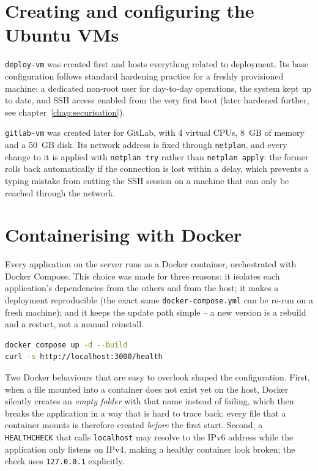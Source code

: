 \section{Creating and configuring the Ubuntu VMs}
\texttt{deploy-vm} was created first and hosts everything related to deployment. Its base configuration follows standard hardening practice for a freshly provisioned machine: a dedicated non-root user for day-to-day operations, the system kept up to date, and SSH access enabled from the very first boot (later hardened further, see chapter~\ref{chap:securisation}).

\texttt{gitlab-vm} was created later for GitLab, with 4 virtual CPUs, 8~GB of memory and a 50~GB disk. Its network address is fixed through \texttt{netplan}, and every change to it is applied with \texttt{netplan try} rather than \texttt{netplan apply}: the former rolls back automatically if the connection is lost within a delay, which prevents a typing mistake from cutting the SSH session on a machine that can only be reached through the network.

\section{Containerising with Docker}
Every application on the server runs as a Docker container, orchestrated with Docker Compose. This choice was made for three reasons: it isolates each application's dependencies from the others and from the host; it makes a deployment reproducible (the exact same \texttt{docker-compose.yml} can be re-run on a fresh machine); and it keeps the update path simple -- a new version is a rebuild and a restart, not a manual reinstall.

\begin{lstlisting}[language=bash,caption={Starting a service},label={lst:compose-up}]
docker compose up -d --build
curl -s http://localhost:3000/health
\end{lstlisting}

Two Docker behaviours that are easy to overlook shaped the configuration. First, when a file mounted into a container does not exist yet on the host, Docker silently creates an \emph{empty folder} with that name instead of failing, which then breaks the application in a way that is hard to trace back; every file that a container mounts is therefore created \emph{before} the first start. Second, a \texttt{HEALTHCHECK} that calls \texttt{localhost} may resolve to the IPv6 address while the application only listens on IPv4, making a healthy container look broken; the check uses \texttt{127.0.0.1} explicitly.

\clearpage
